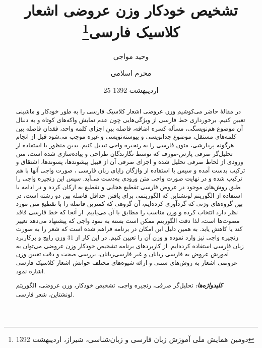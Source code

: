 \documentclass[12pt,onecolumn,a4paper]{article}
\providecommand{\keywords}[1]{\textbf{\textit{کلیدواژه‌ها:}} #1}
\begin{document}
    \title{تشخیص خودکار وزن عروضی اشعار کلاسیک فارسی\footnote{دومین همایش ملی آموزش زبان فارسی و زبان‌شناسی، شیراز، اردیبهشت 1392}}
    \author[1]{وحید مواجی}
    \author[2]{محرم اسلامی}
    \date{25 اردیبهشت 1392}
    \maketitle

    \begin{abstract}
        در مقالۀ حاضر می‌کوشیم وزن عروضی اشعار کلاسیک فارسی را به طور خودکار و ماشینی تعیین کنیم. برخورداری خط فارسی از ویژگی‌هایی چون عدم نمایش واکه‌های کوتاه و به دنبال آن موضوع هم‌نویسگی، مسأله کسره اضافه، فاصله بینِ اجزای کلمه واحد، فقدان فاصله بین کلمه‌های مستقل، موضوعِ جدانویسی و پیوسته‌نویسی و غیره موجب می‌شود قبل از انجام هرگونه پردازشی، متون فارسی را به زنجیره واجی تبدیل کنیم. بدین منظور با استفاده از تحلیل‌گر صرفی پارس-مورف که توسط نگارندگان طراحی و پیاده‌سازی شده است، متن ورودی از لحاظ صرفی تحلیل شده و اجزای صرفی آن از قبیل پیشوندها، پسوندها، اشتقاق و ترکیب بدست آمده و سپس با استفاده از واژگان زایای زبان فارسی {\mfo\citep{eslami_83}}، صورت واجی‌ آنها با هم ترکیب شده و در نهایت صورت واجی متن ورودی به‌دست می‌آید. سپس این زنجیره واجی را طبق روش‌های موجود در عروض فارسی تقطیع هجایی و تقطیع به ارکان کرده و در ادامه با استفاده از الگوریتم لونشتاین که الگوریتمی برای یافتن حداقل فاصله بین دو رشته است، در بین گروه‌های وزنی که گردآوری کرده‌ایم، آن گروهی که کمترین فاصله را با تقطیع متن مورد نظر دارد انتخاب کرده و وزن مناسب را مطابق با آن می‌یابیم. از آنجا که خط فارسی فاقد مصوت‌ها است، لذا دقت الگوریتم ممکن است بسته به نمود واجی که پیشنهاد می‌دهد تغییر کند یا کاهش یابد. به همین دلیل این امکان در برنامه فراهم شده است که شعر را به صورت زنجیره واجی نیز وارد نموده و وزن آن را تعیین کنیم. در این کار از 31 وزن رایج و پرکاربرد زبان فارسی استفاده کرده‌ایم. از کاربردهای برنامه تشخیص خودکار وزن عروضی می‌توان به آموزش عروض به فارسی زبانان و غیر فارسی‌زبانان، بررسی صحت و دقت تعیین وزن عروضی اشعار به روش‌های سنتی و ارائه شیوه‌های مختلف خوانش اشعار کلاسیک فارسی اشاره نمود.
        \par
        \keywords{تحلیل‌گر صرفی، زنجیره واجی، تشخیص خودکار، وزن عروضی، الگوریتم لونشتاین، شعر فارسی.}
    \end{abstract}
\end{document}

